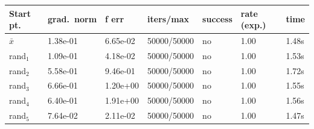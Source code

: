 \begin{tabular}{lllllll}
\toprule
Start pt. & grad.\ norm & f err & iters/max & success & rate (exp.) & time \\
\midrule
\(\bar{x}\) & 1.38e-01 & 6.65e-02 & 50000/50000 & no & 1.00 & 1.48s \\
rand$_{1}$ & 1.09e-01 & 4.18e-02 & 50000/50000 & no & 1.00 & 1.53s \\
rand$_{2}$ & 5.58e-01 & 9.46e-01 & 50000/50000 & no & 1.00 & 1.72s \\
rand$_{3}$ & 6.66e-01 & 1.20e+00 & 50000/50000 & no & 1.00 & 1.55s \\
rand$_{4}$ & 6.40e-01 & 1.91e+00 & 50000/50000 & no & 1.00 & 1.56s \\
rand$_{5}$ & 7.64e-02 & 2.11e-02 & 50000/50000 & no & 1.00 & 1.47s \\
\bottomrule
\end{tabular}
